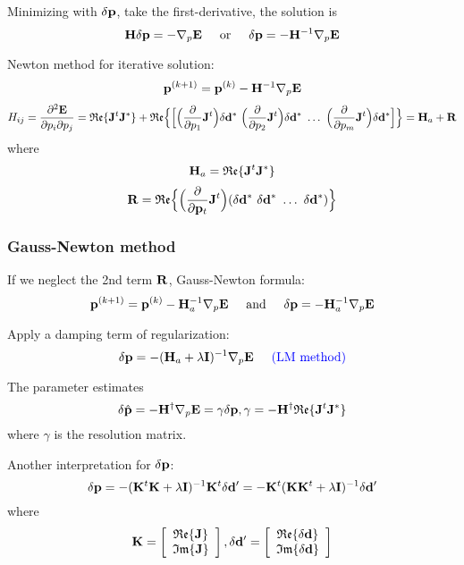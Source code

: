 Minimizing with $\delta\mathbf{p}$, take the first-derivative, the solution is
\[ \mathbf{H}\delta\mathbf{p}=-\nabla_p\mathbf{E} \text{\hspace{5mm}or\hspace{5mm}} \delta\mathbf{p}=-\mathbf{H}^{-1}\nabla_p\mathbf{E} \]

Newton method for iterative solution:
\[ \mathbf{p}^{(k+1)}=\mathbf{p}^{(k)}-\mathbf{H}^{-1}\nabla_p\mathbf{E} \]
\[ H_{ij}=\frac{\partial^2\mathbf{E}}{\partial p_i\partial p_j}=\mathfrak{Re}\{\mathbf{J}^t\mathbf{J}^*\}+\mathfrak{Re}\Big\{\Big[\Big(\frac{\partial}{\partial p_1}\mathbf{J}^t\Big)\delta\mathbf{d}^*~\Big(\frac{\partial}{\partial p_2}\mathbf{J}^t\Big)\delta\mathbf{d}^*~\ldots~\Big(\frac{\partial}{\partial p_m}\mathbf{J}^t\Big)\delta\mathbf{d}^*\Big]\Big\}=\mathbf{H}_a+\mathbf{R} \]
where
\[ \mathbf{H}_a=\mathfrak{Re}\{\mathbf{J}^t\mathbf{J}^*\} \]
\[ \mathbf{R}=\mathfrak{Re}\Big\{\Big(\frac{\partial}{\partial\mathbf{p}_t}\mathbf{J}^t\Big)(\delta\mathbf{d}^*~\delta\mathbf{d}^*~\ldots~\delta\mathbf{d}^*)\Big\} \]

\subsubsection{Gauss-Newton method}
If we neglect the 2nd term $\mathbf{R}$, Gauss-Newton formula:
\[ \mathbf{p}^{(k+1)}=\mathbf{p}^{(k)}-\mathbf{H}_a^{-1}\nabla_p\mathbf{E} \text{\hspace{5mm}and\hspace{5mm}} \delta\mathbf{p}=-\mathbf{H}_a^{-1}\nabla_p\mathbf{E} \]

Apply a damping term of regularization:
\[ \delta\mathbf{p}=-(\mathbf{H}_a+\lambda\mathbf{I})^{-1}\nabla_p\mathbf{E} \text{\hspace{5mm}{\color{blue}(LM method)}}\]

The parameter estimates
\[ \delta\hat{\mathbf{p}}=-\mathbf{H}^\dagger\nabla_p\mathbf{E}=\gamma\delta\mathbf{p},\gamma=-\mathbf{H}^\dagger\mathfrak{Re}\{\mathbf{J}^t\mathbf{J}^*\} \]
where $\gamma$ is the resolution matrix.

Another interpretation for $\delta\mathbf{p}$:
\[ \delta\mathbf{p}=-(\mathbf{K}^t\mathbf{K}+\lambda\mathbf{I})^{-1}\mathbf{K}^t\delta\mathbf{d}'=-\mathbf{K}^t(\mathbf{K}\mathbf{K}^t+\lambda\mathbf{I})^{-1}\delta\mathbf{d}' \]
where
\begin{equation*}
  \mathbf{K}=\left[ \begin{array}{c}
    \mathfrak{Re}\{\mathbf{J}\} \\
    \mathfrak{Im}\{\mathbf{J}\}
  \end{array}\right],
  \delta\mathbf{d}'=\left[ \begin{array}{c}
    \mathfrak{Re}\{\delta\mathbf{d}\} \\
    \mathfrak{Im}\{\delta\mathbf{d}\}
  \end{array}\right]
\end{equation*}

